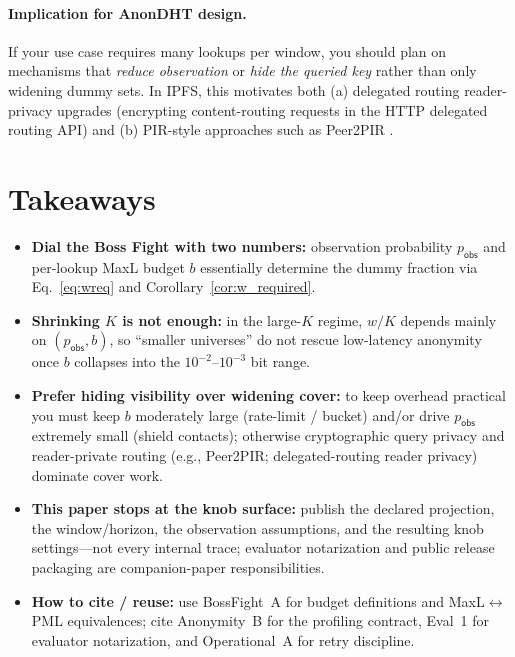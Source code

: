 \documentclass[11pt]{article}
\begin{document}
\paragraph{Implication for AnonDHT design.}
If your use case requires many lookups per window, you should plan on mechanisms that \emph{reduce observation} or \emph{hide the queried key} rather than only widening dummy sets.
In IPFS, this motivates both (a) delegated routing reader-privacy upgrades (encrypting content-routing requests in the HTTP delegated routing API) \cite{ipip0421_reader_privacy,ipfs_http_routing_v1} and (b) PIR-style approaches such as Peer2PIR \cite{mazmudar2025peer2pir}.

\section{Takeaways}
\begin{itemize}[leftmargin=*]
\item \textbf{Dial the Boss Fight with two numbers:} observation probability $p_{\mathsf{obs}}$ and per-lookup MaxL budget $b$ essentially determine the dummy fraction via Eq.~\eqref{eq:wreq} and Corollary~\ref{cor:w_required}.
\item \textbf{Shrinking $K$ is not enough:} in the large-$K$ regime, $w/K$ depends mainly on $(p_{\mathsf{obs}},b)$, so ``smaller universes'' do not rescue low-latency anonymity once $b$ collapses into the $10^{-2}$--$10^{-3}$ bit range.
\item \textbf{Prefer hiding visibility over widening cover:} to keep overhead practical you must keep $b$ moderately large (rate-limit / bucket) and/or drive $p_{\mathsf{obs}}$ extremely small (shield contacts); otherwise cryptographic query privacy and reader-private routing (e.g., Peer2PIR; delegated-routing reader privacy) dominate cover work.
\item \textbf{This paper stops at the knob surface:} publish the declared projection, the window/horizon, the observation assumptions, and the resulting knob settings---not every internal trace; evaluator notarization and public release packaging are companion-paper responsibilities.
\item \textbf{How to cite / reuse:} use BossFight~A for budget definitions and MaxL$\leftrightarrow$PML equivalences; cite Anonymity~B for the profiling contract, Eval~1 for evaluator notarization, and Operational~A for retry discipline.
\end{itemize}
\end{document}

